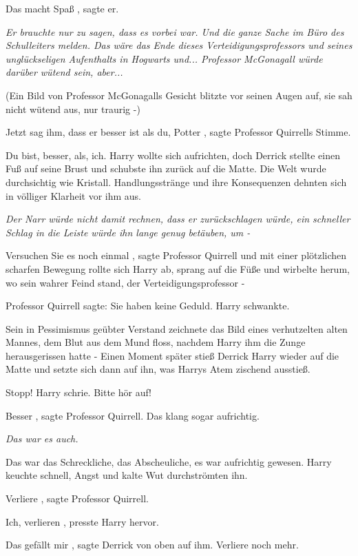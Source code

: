 \glqq Das macht Spaß\grqq{} , sagte er.

\emph{Er brauchte nur zu sagen, dass es vorbei war. Und die ganze Sache im Büro
des Schulleiters melden. Das wäre das Ende dieses Verteidigungsprofessors und
seines unglückseligen Aufenthalts in Hogwarts und... Professor McGonagall würde
darüber wütend sein, aber...}

(Ein Bild von Professor McGonagalls Gesicht blitzte vor seinen Augen auf, sie
sah nicht wütend aus, nur traurig -)

\glqq Jetzt sag ihm, dass er besser ist als du, Potter\grqq{} , sagte Professor
Quirrells Stimme.

\glqq Du bist, besser, als, ich.\grqq{} Harry wollte sich aufrichten, doch
Derrick stellte einen Fuß auf seine Brust und schubste ihn zurück auf die Matte.
Die Welt wurde durchsichtig wie Kristall. Handlungsstränge und ihre Konsequenzen
dehnten sich in völliger Klarheit vor ihm aus.

\emph{ Der Narr würde nicht damit rechnen, dass er zurückschlagen würde, ein
schneller Schlag in die Leiste würde ihn lange genug betäuben, um -}

\glqq Versuchen Sie es noch einmal\grqq{} , sagte Professor Quirrell und mit
einer plötzlichen scharfen Bewegung rollte sich Harry ab, sprang auf die Füße
und wirbelte herum, wo sein wahrer Feind stand, der Verteidigungsprofessor -

Professor Quirrell sagte: \glqq Sie haben keine Geduld.\grqq{} Harry schwankte.

Sein in Pessimismus geübter Verstand zeichnete das Bild eines verhutzelten alten
Mannes, dem Blut aus dem Mund floss, nachdem Harry ihm die Zunge herausgerissen
hatte - Einen Moment später stieß Derrick Harry wieder auf die Matte und setzte
sich dann auf ihn, was Harrys Atem zischend ausstieß.

\glqq Stopp!\grqq{} Harry schrie. \glqq Bitte hör auf!\grqq{}

\glqq Besser\grqq{} , sagte Professor Quirrell. \glqq Das klang sogar
aufrichtig.\grqq{}

\emph{ Das war es auch.}

Das war das Schreckliche, das Abscheuliche, es war aufrichtig gewesen. Harry
keuchte schnell, Angst und kalte Wut durchströmten ihn.

\glqq Verliere\grqq{} , sagte Professor Quirrell.

\glqq Ich, verlieren\grqq{} , presste Harry hervor.

\glqq Das gefällt mir\grqq{} , sagte Derrick von oben auf ihm. \glqq Verliere
noch mehr.\grqq{}

